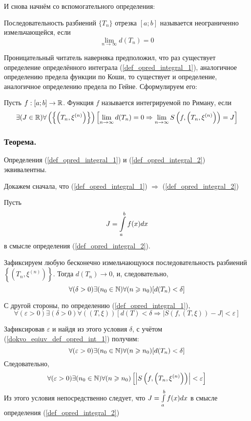 И снова начнём со вспомогательного определения:

\opred
Последовательность разбиений $\{T_n\}$ отрезка $[a;b]$ называется неограниченно измельчающейся, если 
$$\lim_{n\to\infty}d(T_n) = 0$$

Проницательный читатель наверняка предположил, что раз существует определение определённого интеграла (\ref{def_opred_integral_1}), аналогичное определению предела функции по Коши, то существует и определение, аналогичное определению предела по Гейне. Сформулируем его:

\begin{opr}\label{eqiv_opr_opr_intl}
Пусть $f:[a;b]\to \mathbb{R}$. Функция $f$ называется интегрируемой по Риману, если
\begin{equation}\label{def_opred_integral_2}
\exists(J\in\mathbb{R})\forall\left(\left\{\left(T_n,\xi^{(n)}\right)\right\}\right)
\left[\lim_{n\to\infty}d(T_n) = 0 \Rightarrow \lim_{n\to\infty}S\left(f,\left(T_n,\xi^{(n)}\right)\right)=J\right]
\end{equation}
\end{opr}

\subsubsection{Теорема.}
Определения (\ref{def_opred_integral_1}) и (\ref{def_opred_integral_2}) эквивалентны.

Докажем сначала, что (\ref{def_opred_integral_1}) $\Rightarrow$ (\ref{def_opred_integral_2})

\dokvo
Пусть $$J=\int\limits_a^b f(x) dx $$ в смысле определения (\ref{def_opred_integral_2}).

Зафиксируем любую бесконечно измельчающуюся последовательность разбиений $\left\{\left( T_n, \xi^{(n)}\right)\right\}$. Тогда $d(T_n)\to 0$, и, следовательно,
\begin{equation}\label{dokvo_eqiuv_def_opred_int_1}
\forall(\delta>0)\exists(n_0\in\mathbb{N})\forall(n\geqslant n_0)[d(T_n)<\delta]
\end{equation}

С другой стороны, по определению (\ref{def_opred_integral_1}),
$$
\forall(\varepsilon>0)\exists(\delta>0)\forall((T,\xi))[d(T)<\delta \Rightarrow |S(f,(T,\xi))-J|<\varepsilon]
$$

Зафиксировав $\varepsilon$ и найдя из этого условия $\delta$, с учётом (\ref{dokvo_eqiuv_def_opred_int_1}) получим:
$$
\forall(\varepsilon>0)\exists(n_0\in\mathbb{N})\forall(n\geqslant n_0)[d(T_n)<\delta]
$$
Следовательно,
$$
\forall(\varepsilon>0)\exists(n_0\in\mathbb{N})\forall(n\geqslant n_0)\left[\left|S\left(f,\left(T_n,\xi^{(n)}\right)\right)\right|<\varepsilon\right]
$$
Из этого условия непосредственно следует, что $J=\int\limits_a^b f(x) dx$ в смысле определения (\ref{def_opred_integral_2})

